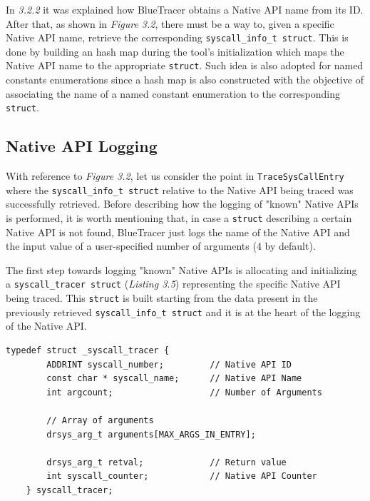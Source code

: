 In \textit{3.2.2} it was explained how BlueTracer obtains a Native API name from its ID. After that, as shown in \textit{Figure 3.2}, there must be a way to, given a specific Native API name, retrieve the corresponding \texttt{syscall\_info\_t struct}. This is done by building an hash map during the tool's initialization which maps the Native API name to the appropriate \texttt{struct}. Such idea is also adopted for named constants enumerations since a hash map is also constructed with the objective of associating the name of a named constant enumeration to the corresponding \texttt{struct}.    

\subsection{Native API Logging}
With reference to \textit{Figure 3.2}, let us consider the point in \texttt{TraceSysCallEntry} where the \texttt{syscall\_info\_t struct} relative to the Native API being traced was successfully retrieved. Before describing how the logging of "known" Native APIs is performed, it is worth mentioning that, in case a \texttt{struct} describing a certain Native API is not found, BlueTracer just logs the name of the Native API and the input value of a user-specified number of arguments (4 by default).

The first step towards logging "known" Native APIs is allocating and initializing a \texttt{syscall\_tracer struct} (\textit{Listing 3.5}) representing the specific Native API being traced. This \texttt{struct} is built starting from the data present in the previously retrieved  \texttt{syscall\_info\_t struct} and it is at the heart of the logging of the Native API.
\\
\begin{lstlisting}[caption={\texttt{struct} representing the Native API being traced},captionpos=b]
	typedef struct _syscall_tracer {
		ADDRINT syscall_number;			// Native API ID
		const char * syscall_name;		// Native API Name
		int argcount;				    // Number of Arguments

		// Array of arguments
		drsys_arg_t arguments[MAX_ARGS_IN_ENTRY];

		drsys_arg_t retval;			    // Return value
		int syscall_counter;			// Native API Counter
	} syscall_tracer;
\end{lstlisting}

